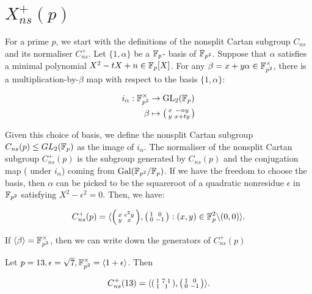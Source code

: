 \section{$X_{ns}^+(p)$}

For a prime $p$, we start with the definitions of the nonsplit Cartan subgroup $C_{ns}$ and its normaliser $C_{ns}^+$. Let $\{ 1, \alpha \}$ be a $\mathbb{F}_p$- basis of $\mathbb{F}_{p^2}$. Suppose that $\alpha$ satisfies a minimal polynomial $X^2 - tX + n \in \mathbb{F}_p[X]$. For any $\beta = x + y\alpha \in \mathbb{F}_{p^2}^\times$, there is a multiplication-by-$\beta$ map with respect to the basis $\{ 1, \alpha \}$:

\begin{align*}
i_\alpha : \mathbb{F}_{p^2}^\times &\rightarrow \operatorname{GL}_2(\mathbb{F}_p) \\
\beta &\mapsto \begin{psmallmatrix} x & -ny \\ y & x + ty \end{psmallmatrix}
\end{align*}

Given this choice of basis, we define the nonsplit Cartan subgroup $C_{ns}(p) \leq GL_2(\mathbb{F}_p)$ as the image of $i_\alpha$. The normaliser of the nonsplit Cartan subgroup $C_{ns}^+(p)$ is the subgroup generated by $C_{ns}(p)$ and the conjugation map ( under $i_\alpha$) coming from $\operatorname{Gal}(\mathbb{F}_{p^2}/\mathbb{F}_p)$. If we have the freedom to choose the basis, then $\alpha$ can be picked to be the squareroot of a quadratic nonresidue $\epsilon$ in $\mathbb{F}_{p^2}$ satisfying $X^2 - \epsilon^2 = 0$. Then, we have:

\[
 C_{ns}^+(p) = \langle \begin{psmallmatrix} x & \epsilon^2 y \\ y & x\end{psmallmatrix} , \begin{psmallmatrix} 1 & 0 \\ 0 & -1 \end{psmallmatrix} : (x,y) \in \mathbb{F}_p^2 \backslash (0,0) \rangle.
 \]
 
 If $\langle \beta \rangle= \mathbb{F}_{p^2}^\times$, then we can write down the generators of $C_{ns}^+(p)$
 
 \begin{example}
 Let $p = 13, \epsilon = \sqrt{7}, \mathbb{F}_{p^2}^\times = \langle 1 + \epsilon \rangle$. Then 
 
 \[
 C_{ns}^+(13) = \langle \begin{psmallmatrix} 1 & 7 \cdot 1 \\ 1 & 1 \end{psmallmatrix}, \begin{psmallmatrix} 1 & 0 \\ 0 & -1 \end{psmallmatrix} \rangle.
 \]
 \end{example}
 
